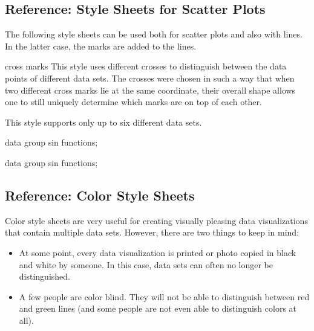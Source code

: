 \subsection{Reference: Style Sheets for Scatter Plots}

The following style sheets can be used both for scatter plots and also with
lines. In the latter case, the marks are added to the lines.

\begin{stylesheet}{cross marks}
    This style uses different crosses to distinguish between the data points of
    different data sets. The crosses were chosen in such a way that when two
    different cross marks lie at the same coordinate, their overall shape
    allows one to still uniquely determine which marks are on top of each
    other.

    This style supports only up to six different data sets.
\begin{codeexample}[width=10cm]
\tikz \datavisualization [
  visualize as scatter/.list=
    {1,2,3,4,5,6,7,8},
  example visualization,
  style sheet=cross marks]
data group {sin functions};
\end{codeexample}
\begin{codeexample}[width=10cm]
\tikz \datavisualization [
  visualize as smooth line/.list=
    {1,2,3,4,5,6,7,8},
  example visualization,
  style sheet=cross marks]
data group {sin functions};
\end{codeexample}
\end{stylesheet}


\subsection{Reference: Color Style Sheets}

Color style sheets are very useful for creating visually pleasing data
visualizations that contain multiple data sets. However, there are two things
to keep in mind:
%
\begin{itemize}
    \item At some point, every data visualization is printed or photo copied in
        black and white by someone. In this case, data sets can often no longer
        be distinguished.
    \item A few people are color blind. They will not be able to distinguish
        between red and green lines (and some people are not even able to
        distinguish colors at all).
\end{itemize}

